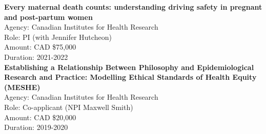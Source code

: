 \documentclass[
  letterpaper,
  DIV=11,
  numbers=noendperiod]{scrartcl}
\begin{document}
\textbf{Every maternal death counts: understanding driving safety in
pregnant and post-partum women}\\
\hspace*{0.333em}\hspace*{0.333em}\hspace*{0.333em}\hspace*{0.333em}Agency:
Canadian Institutes for Health Research\\
\hspace*{0.333em}\hspace*{0.333em}\hspace*{0.333em}\hspace*{0.333em}Role:
PI (with Jennifer Hutcheon)\\
\hspace*{0.333em}\hspace*{0.333em}\hspace*{0.333em}\hspace*{0.333em}Amount:
CAD \$75,000\\
\hspace*{0.333em}\hspace*{0.333em}\hspace*{0.333em}\hspace*{0.333em}Duration:
2021-2022\\

\textbf{Establishing a Relationship Between Philosophy and
Epidemiological Research and Practice: Modelling Ethical Standards of
Health Equity (MESHE)}\\
\hspace*{0.333em}\hspace*{0.333em}\hspace*{0.333em}\hspace*{0.333em}Agency:
Canadian Institutes for Health Research\\
\hspace*{0.333em}\hspace*{0.333em}\hspace*{0.333em}\hspace*{0.333em}Role:
Co-applicant (NPI Maxwell Smith)\\
\hspace*{0.333em}\hspace*{0.333em}\hspace*{0.333em}\hspace*{0.333em}Amount:
CAD \$20,000\\
\hspace*{0.333em}\hspace*{0.333em}\hspace*{0.333em}\hspace*{0.333em}Duration:
2019-2020\\
\end{document}
